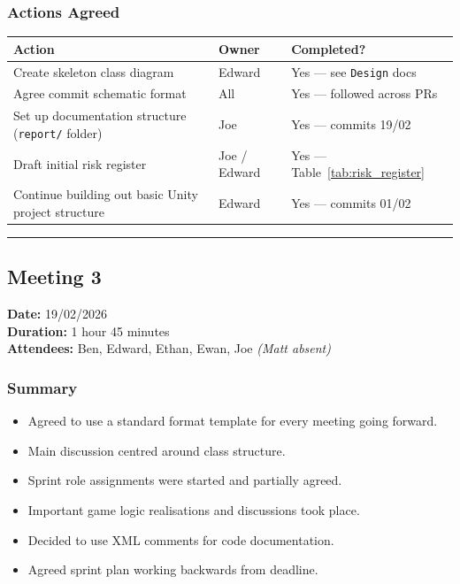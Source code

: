 \subsubsection*{Actions Agreed}

\begin{table}[H]
\centering
\small
\begin{tabular}{|p{6cm}|p{1.8cm}|p{2.8cm}|}
\hline
\textbf{Action} & \textbf{Owner} & \textbf{Completed?} \\ \hline
Create skeleton class diagram & Edward & Yes --- see \texttt{Design} docs \\ \hline
Agree commit schematic format & All & Yes --- followed across PRs \\ \hline
Set up documentation structure (\texttt{report/} folder) & Joe & Yes --- commits 19/02 \\ \hline
Draft initial risk register & Joe / Edward & Yes --- Table~\ref{tab:risk_register} \\ \hline
Continue building out basic Unity project structure & Edward & Yes --- commits 01/02 \\ \hline
\end{tabular}
\end{table}

\smallskip
\hrule
\smallskip

\subsection{Meeting 3}
\textbf{Date:} 19/02/2026 \\
\textbf{Duration:} 1 hour 45 minutes \\
\textbf{Attendees:} Ben, Edward, Ethan, Ewan, Joe \textit{(Matt absent)}

\subsubsection*{Summary}
\begin{itemize}
    \item Agreed to use a standard format template for every meeting going forward.
    \item Main discussion centred around class structure.
    \item Sprint role assignments were started and partially agreed.
    \item Important game logic realisations and discussions took place.
    \item Decided to use XML comments for code documentation.
    \item Agreed sprint plan working backwards from deadline.
\end{itemize}

